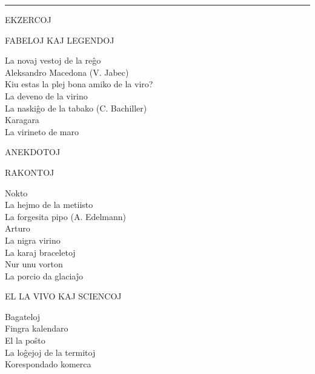 \begin{center}
\thispagestyle{plain}
\end{center}

{ %

\setlength{\parindent}{0pt}
\setlength{\parskip}{1em}

{\centering \rule{13mm}{0.4pt}\par}

{\sansfont EKZERCOJ} \dotfill \pageref{ekzercoj}

{\centering \sansfont FABELOJ KAJ LEGENDOJ\par}

La novaj vestoj de la reĝo \dotfill \pageref{novajvestoj} \\
Aleksandro Macedona (V. Jabec) \dotfill \pageref{aleksandro} \\
Kiu estas la plej bona amiko de la viro? \dotfill \pageref{plejbona} \\
La deveno de la virino \dotfill \pageref{deveno} \\
La naskiĝo de la tabako (C. Bachiller) \dotfill \pageref{tabako}\\
Karagara \dotfill \pageref{karagara} \\
La virineto de maro \dotfill \pageref{virineto}

{\sansfont ANEKDOTOJ} \dotfill \pageref{anekdotoj}

{\centering \sansfont RAKONTOJ\par}

Nokto \dotfill \pageref{nokto} \\
La hejmo de la metiisto \dotfill \pageref{metiisto}\\
La forgesita pipo (A. Edelmann) \dotfill \pageref{pipo}\\
Arturo \dotfill \pageref{arturo}\\
La nigra virino \dotfill \pageref{nigra}\\
La karaj braceletoj \dotfill \pageref{braceletoj}\\
Nur unu vorton \dotfill \pageref{unuvorton}\\
La porcio da glaciaĵo \dotfill \pageref{porcio}

{\centering \sansfont EL LA VIVO KAJ SCIENCOJ\par}

Bagateloj \dotfill \pageref{bagateloj} \\
Fingra kalendaro \dotfill \pageref{fingra} \\
El la poŝto \dotfill \pageref{posxto} \\
La loĝejoj de la termitoj \dotfill \pageref{termitoj} \\
Korespondado komerca \dotfill \pageref{komerca} 

}
